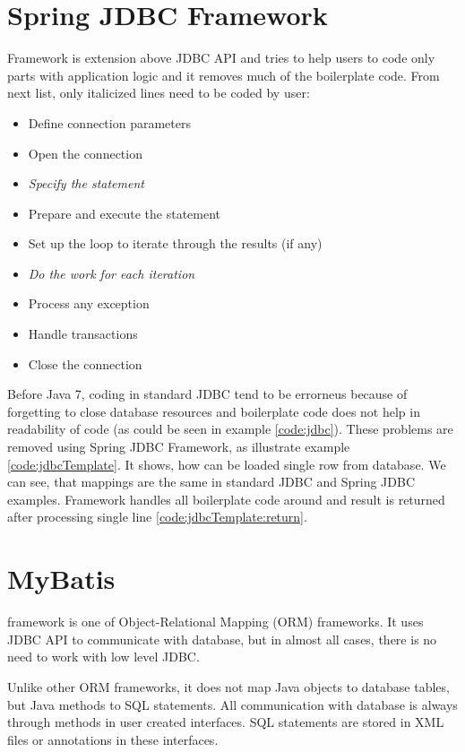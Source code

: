 \section{Spring JDBC Framework \label{frameworks:jdbcTemplate}}
\citet{SpringJDBC} Framework is extension above JDBC API and tries to help users to code only
parts with application logic and it removes much of the boilerplate code.
From next list, only italicized lines need to be coded by user:
\begin{itemize}
  \item Define connection parameters
  \item Open the connection
  \item \textit{Specify the statement}
  \item Prepare and execute the statement
  \item Set up the loop to iterate through the results (if any)
  \item \textit{Do the work for each iteration}
  \item Process any exception
  \item Handle transactions
  \item Close the connection   
\end{itemize}

Before Java 7, coding in standard JDBC tend to be errorneus because of forgetting to close
database resources and boilerplate code does not help in readability of code
(as could be seen in example \ref{code:jdbc}). These problems are removed using Spring JDBC Framework,
as illustrate example \ref{code:jdbcTemplate}. It shows, how can be loaded single row from database.
We can see, that mappings are the same in standard JDBC and Spring JDBC examples.
Framework handles all boilerplate code around and result is returned after processing single line \ref{code:jdbcTemplate:return}.







\section{MyBatis \label{frameworks:myBatis}}

\citet{MyBatis} framework is one of Object-Relational Mapping (ORM) frameworks.
It uses JDBC API to communicate with database, but in almost all cases, there is no need
to work with low level JDBC.

Unlike other ORM frameworks, it does not map Java objects to database tables, but Java methods
to SQL statements. All communication with database is always through methods in user created interfaces.
SQL statements are stored in XML files or annotations in these interfaces.

